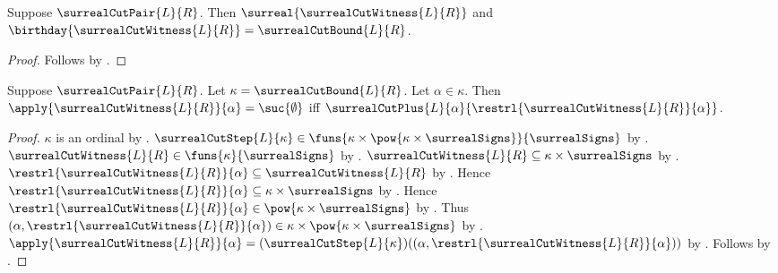 \begin{proposition}\label{surreal_cut_witness_is_surreal}
    Suppose $\surrealCutPair{L}{R}$.
    Then $\surreal{\surrealCutWitness{L}{R}}$ and
        $\birthday{\surrealCutWitness{L}{R}}=
            \surrealCutBound{L}{R}$.
\end{proposition}
\begin{proof}
    Follows by
        .
\end{proof}

\begin{proposition}\label{surreal_cut_witness_sign}
    Suppose $\surrealCutPair{L}{R}$.
    Let $\kappa=\surrealCutBound{L}{R}$.
    Let $\alpha\in\kappa$.
    Then $\apply{\surrealCutWitness{L}{R}}{\alpha}=\suc{\emptyset}$ iff
        $\surrealCutPlus{L}{\alpha}
            {\restrl{\surrealCutWitness{L}{R}}{\alpha}}$.
\end{proposition}
\begin{proof}
    $\kappa$ is an ordinal by .
    $\surrealCutStep{L}{\kappa}\in
        \funs{\kappa\times\pow{\kappa\times\surrealSigns}}
            {\surrealSigns}$
        by .
    $\surrealCutWitness{L}{R}\in\funs{\kappa}{\surrealSigns}$
        by .
    $\surrealCutWitness{L}{R}\subseteq
        \kappa\times\surrealSigns$
        by .
    $\restrl{\surrealCutWitness{L}{R}}{\alpha}
        \subseteq\surrealCutWitness{L}{R}$
        by .
    Hence $\restrl{\surrealCutWitness{L}{R}}{\alpha}
        \subseteq\kappa\times\surrealSigns$
        by .
    Hence $\restrl{\surrealCutWitness{L}{R}}{\alpha}
        \in\pow{\kappa\times\surrealSigns}$
        by .
    Thus $(\alpha,\restrl{\surrealCutWitness{L}{R}}{\alpha})
        \in\kappa\times\pow{\kappa\times\surrealSigns}$
        by .
    $\apply{\surrealCutWitness{L}{R}}{\alpha}=
        (\surrealCutStep{L}{\kappa})
            ((\alpha,\restrl{\surrealCutWitness{L}{R}}{\alpha}))$
        by .
    Follows by
        .
\end{proof}

